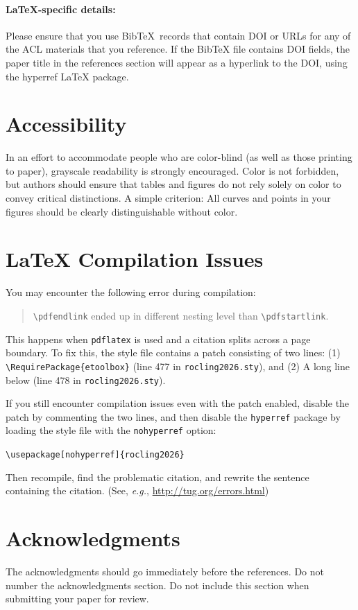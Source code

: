\documentclass[11pt,a4paper]{article}
\begin{document}
\paragraph{\LaTeX-specific details:}
Please ensure that you use Bib\TeX\ records that contain DOI or URLs for any of the ACL materials that you reference.
If the Bib\TeX{} file contains DOI fields, the paper title in the references section will appear as a hyperlink to the DOI, using the hyperref \LaTeX{} package.


\section{Accessibility}
\label{ssec:accessibility}

In an effort to accommodate people who are color-blind (as well as those printing to paper), grayscale readability is strongly encouraged.
Color is not forbidden, but authors should ensure that tables and figures do not rely solely on color to convey critical distinctions.
A simple criterion:
All curves and points in your figures should be clearly distinguishable without color.


\section{\LaTeX{} Compilation Issues}
You may encounter the following error during compilation: 
\begin{quote}
{\small\verb|\pdfendlink|} ended up in different nesting level than {\small\verb|\pdfstartlink|}.
\end{quote}
This happens when \texttt{\small pdflatex} is used and a citation splits across a page boundary.
To fix this, the style file contains a patch consisting of two lines:
(1) {\small\verb|\RequirePackage{etoolbox}|} (line 477 in \texttt{\small rocling2026.sty}), and
(2) A long line below (line 478 in \texttt{\small rocling2026.sty}).

If you still encounter compilation issues even with the patch enabled, disable the patch by commenting the two lines, and then disable the \texttt{\small hyperref} package by loading the style file with the \texttt{\small nohyperref} option:

\noindent
{\small\verb|\usepackage[nohyperref]{rocling2026}|}

\noindent
Then recompile, find the problematic citation, and rewrite the sentence containing the citation. (See, {\em e.g.}, \url{http://tug.org/errors.html})

\section*{Acknowledgments}

The acknowledgments should go immediately before the references. Do not number the acknowledgments section.
Do not include this section when submitting your paper for review.



\end{document}
